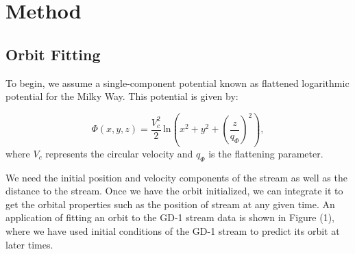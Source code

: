 \documentclass[preprint]{aastex}
\begin{document}
\section{Method} \label{label:methodsection}

\subsection{Orbit Fitting}
To begin, we assume a single-component potential known as flattened logarithmic potential for the Milky Way. This potential is given by:

\begin{equation} \label{eq:logPotential}
\Phi(x,y,z) = \frac{V_c^2}{2} \, \mathrm{ln} \left ({x}^2 + y^2 + \left ( \frac{z}{q_{\Phi}}\right )^2 \right ),
\end{equation}
where $V_c$ represents the circular velocity and $q_{\Phi}$ is the flattening parameter. 

We need the initial position and velocity components of the stream as well as the distance to the stream. Once we have the orbit initialized, we can integrate it to get the orbital properties such as the position of stream at any given time. An application of fitting an orbit to the GD-1 stream data is shown in Figure (1), where we have used initial conditions of the GD-1 stream to predict its orbit at later times.
\end{document}
